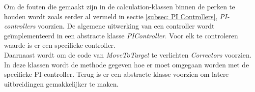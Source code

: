 Om de fouten die gemaakt zijn in de calculation-klassen binnen de perken te houden wordt zoals eerder al vermeld in sectie \ref{subsec: PI Controllers}, \textit{PI-controllers} voorzien. De algemene uitwerking van een controller wordt geïmplementeerd in een abstracte klasse \textit{PIController}. Voor elk te controleren waarde is er een specifieke controller. 
\\
Daarnaast wordt om de code van \textit{MoveToTarget} te verlichten \textit{Correctors} voorzien. In deze klassen wordt de methode gegeven hoe er moet omgegaan worden met de specifieke PI-controller. Terug is er een abstracte klasse voorzien om latere uitbreidingen gemakkelijker te maken. 
\\
\\
